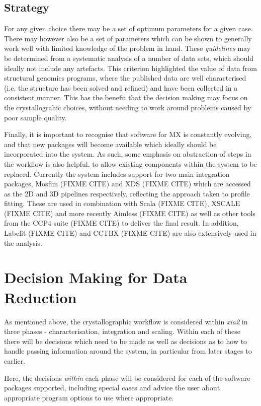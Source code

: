 \documentclass[a4paper,11pt]{article}
\begin{document}
\subsection{Strategy}

For any given choice there may be a set of optimum parameters for a
given case. There may however also be a set of parameters which can be
shown to generally work well with limited knowledge of the problem in
hand. These \emph{guidelines} may be determined from a systematic
analysis of a number of data sets, which should ideally not include
any artefacts. This criterion highlighted the value of data from
structural genomics programs, where the published data are well
characterised (i.e. the structure has been solved and refined) and have been
collected in a consistent manner. This has the benefit that the
decision making may focus on the crystallograhic choices, without
needing to work around problems caused by poor sample quality. 

Finally, it is important to recognise that software for MX is
constantly evolving, and that new packages will become available which
ideally should be incorporated into the system. As such, some emphasis
on abstraction of steps in the workflow is also helpful, to allow
existing components within the system to be replaced. Currently the
system includes support for two main integration packages, Mosflm
(FIXME CITE) and XDS (FIXME CITE) which are accessed as the 2D and 3D
pipelines respectively, reflecting the approach taken to profile
fitting. These are used in combination with Scala (FIXME CITE), XSCALE
(FIXME CITE) and more recently Aimless (FIXME CITE) as well as other
tools from the CCP4 suite (FIXME CITE) to deliver the final result. In
addition, Labelit (FIXME CITE) and CCTBX (FIXME CITE) are also
extensively used in the analysis.

\section{Decision Making for Data Reduction}

As mentioned above, the crystallographic workflow is considered within
\emph{xia2} in three phases - characterisation, integration and
scaling. Within each of these there will be decisions which need to be
made as well as decisions as to how to handle passing information
around the system, in particular from later stages to earlier. 

Here, the decisions \emph{within} each phase will be considered for
each of the software packages supported, including special cases and
advice the user about appropriate program options to use where
appropriate.
\end{document}
